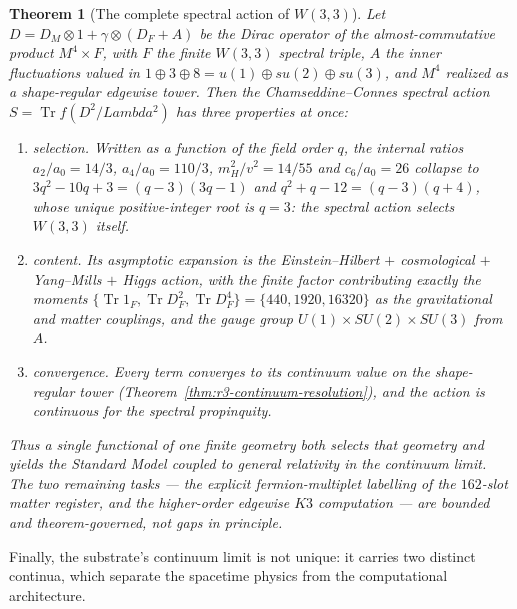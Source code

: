 \documentclass[12pt,a4paper]{article}
\def\mathbf#1{#1}%
\def\textbf#1{#1}%
\def\Lambda{Lambda}%
\newtheorem{theorem}{Theorem}[section]
\theoremstyle{definition}
\begin{document}
\begin{theorem}[The complete spectral action of $W(3,3)$]
\label{thm:complete-spectral-action}
Let $D=D_M\otimes1+\gamma\otimes(D_F+A)$ be the Dirac operator of the
almost-commutative product $M^4\times F$, with $F$ the finite $W(3,3)$ spectral
triple, $A$ the inner fluctuations valued in
$\mathbf1\oplus\mathbf3\oplus\mathbf8=u(1)\oplus su(2)\oplus su(3)$, and $M^4$
realized as a shape-regular edgewise tower. Then the Chamseddine--Connes
spectral action $S=\operatorname{Tr}f(D^2/\Lambda^2)$ has three properties at
once:
\begin{enumerate}[label=\textup{(\alph*)}]
  \item \textbf{selection.} Written as a function of the field order $q$, the
        internal ratios $a_2/a_0=14/3$, $a_4/a_0=110/3$, $m_H^2/v^2=14/55$ and
        $c_6/a_0=26$ collapse to $3q^2-10q+3=(q-3)(3q-1)$ and
        $q^2+q-12=(q-3)(q+4)$, whose unique positive-integer root is $q=3$:
        the spectral action selects $W(3,3)$ itself.
  \item \textbf{content.} Its asymptotic expansion is the Einstein--Hilbert
        $+$ cosmological $+$ Yang--Mills $+$ Higgs action, with the finite
        factor contributing exactly the moments
        $\{\operatorname{Tr}1_F,\operatorname{Tr}D_F^2,\operatorname{Tr}D_F^4\}
        =\{440,1920,16320\}$ as the gravitational and matter couplings, and the
        gauge group $U(1)\times SU(2)\times SU(3)$ from $A$.
  \item \textbf{convergence.} Every term converges to its continuum value on
        the shape-regular tower (Theorem~\ref{thm:r3-continuum-resolution}), and
        the action is continuous for the spectral propinquity.
\end{enumerate}
Thus a single functional of one finite geometry both \emph{selects} that
geometry and \emph{yields} the Standard Model coupled to general relativity in
the continuum limit. The two remaining tasks --- the explicit fermion-multiplet
labelling of the $162$-slot matter register, and the higher-order edgewise
$K3$ computation --- are bounded and theorem-governed, not gaps in principle.
\end{theorem}

Finally, the substrate's continuum limit is not unique: it carries two distinct
continua, which separate the spacetime physics from the computational
architecture.
\end{document}
